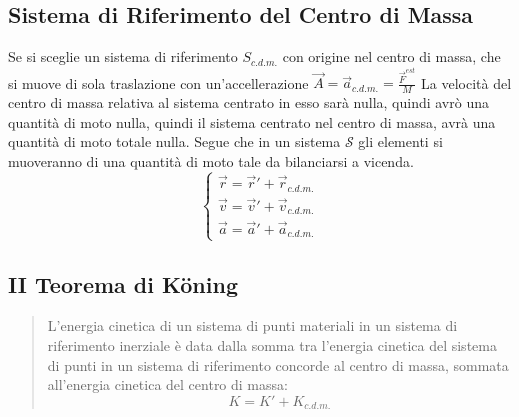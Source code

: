 \documentclass{article}
\numberwithin{equation}{subsection}
\begin{document}
\subsection{Sistema di Riferimento del Centro di Massa}
Se si sceglie un sistema di riferimento $S_{c.d.m.}$ con origine nel centro 
di massa, che si muove di sola traslazione con un'accellerazione 
$\vec{A}=\vec{a}_{c.d.m.}=\displaystyle\frac{\vec{F}^{est}}{M}$ 
La velocità del centro di massa relativa al sistema centrato in 
esso sarà nulla, quindi avrò una quantità di moto nulla, quindi 
il sistema centrato nel centro di massa, avrà una quantità di moto 
totale nulla. Segue che in un sistema $\mathscr{S}$ gli elementi 
si muoveranno di una quantità di moto tale da bilanciarsi a vicenda. 
\begin{equation}
    \begin{cases}
        \vec{r}=\vec{r}'+\vec{r}_{c.d.m.}\\ 
        \vec{v}=\vec{v}'+\vec{v}_{c.d.m.}\\
        \vec{a}=\vec{a}'+\vec{a}_{c.d.m.}
    \end{cases}
\end{equation}
\begin{center}\end{center}

\subsection{II Teorema di K\"{o}ning}
\begin{quotation}
    L'energia cinetica di un sistema di punti materiali in un 
    sistema di riferimento inerziale è data dalla somma tra 
    l'energia cinetica del sistema di punti in un sistema di 
    riferimento concorde al centro di massa, sommata all'energia 
    cinetica del centro di massa:
    \begin{equation}
        K=K'+K_{c.d.m.}
    \end{equation}
\end{quotation}
\end{document}
